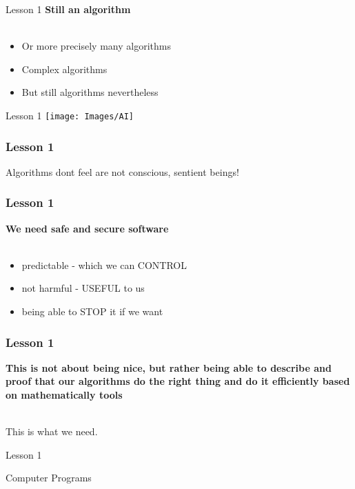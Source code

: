 \documentclass[aspectratio=1610]{beamer}
\begin{document}
\begin{frame}{Lesson 1}{}
\LARGE
\textbf {Still an algorithm\\~\\}
\begin{itemize}
    \item Or more precisely many algorithms
    \item Complex algorithms
    \item But still algorithms nevertheless 
 \end{itemize}
\end{frame}


\begin{frame}{Lesson 1}{}
\texttt{[image: Images/AI]}
\end{frame}


\begin{frame}
\frametitle{Lesson 1}

\Huge Algorithms 
\alert{dont feel} are not 
 \alert{conscious},
 \alert{sentient beings}!
\end{frame}



\begin{frame}
\frametitle{Lesson 1}
\huge
\textbf {We need safe and secure software\\~\\}
\begin{itemize}
	 \item predictable - \alert{which we can CONTROL}
	 \item not harmful - \alert{USEFUL to us}
	 \item \alert{being able to STOP it if we want}
\end{itemize}
\end{frame}


\begin{frame}
\frametitle{Lesson 1}
\huge
\textbf {This is not about being nice, but rather being able to describe and proof that our algorithms do the right thing and do it efficiently based on mathematically tools\\~\\}

This is what we need.
\end{frame}




\begin{frame}{Lesson 1}{}
\begin{center}
\Huge Computer Programs
\end{center}
\end{frame}
\end{document}
